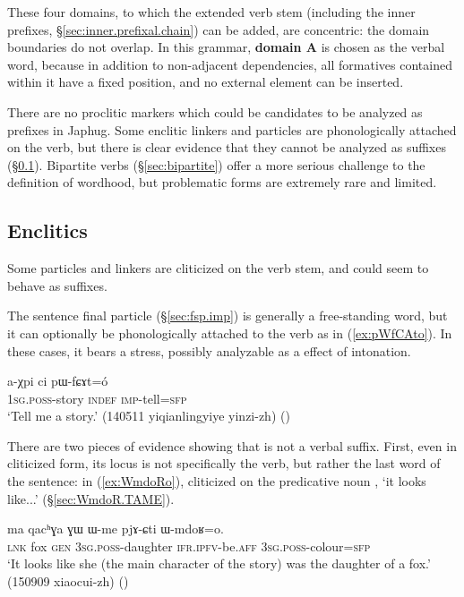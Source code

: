These four domains, to which the extended verb stem (including the inner prefixes, §\ref{sec:inner.prefixal.chain}) can be added, are concentric: the domain boundaries do not overlap. In this grammar, \textbf{domain A} is chosen as the verbal word, because in addition to non-adjacent dependencies, all formatives contained within it have a fixed position, and no external element can be inserted. 

There are no proclitic markers which could be candidates to be analyzed as prefixes in Japhug. Some enclitic linkers and particles are phonologically attached on the verb, but there is clear evidence that they cannot be analyzed as suffixes (§\ref{sec:verb.enclitics}). Bipartite verbs (§\ref{sec:bipartite}) offer a more serious challenge to the definition of wordhood, but problematic forms are extremely rare and limited.

\subsection{Enclitics} \label{sec:verb.enclitics}
Some particles and linkers are cliticized on the verb stem, and could seem to behave as suffixes.

The sentence final particle  (§\ref{sec:fsp.imp}) is generally a free-standing word, but it can optionally be phonologically attached to the verb as in (\ref{ex:pWfCAto}). In these cases, it bears a stress, possibly analyzable as a effect of intonation.


\begin{exe}
\ex \label{ex:pWfCAto}
\gll a-χpi ci pɯ-fɕɤt=ó \\
\textsc{1sg}.\textsc{poss}-story \textsc{indef} \textsc{imp}-tell=\textsc{sfp} \\
\glt `Tell me a story.' (140511 yiqianlingyiye yinzi-zh) 	()
\end{exe}

There are two pieces of evidence showing that  is not a verbal suffix. First, even in cliticized form, its locus is not specifically the verb, but rather the last word of the sentence: in (\ref{ex:WmdoRo}),  cliticized on the predicative noun   , `it looks like...' (§\ref{sec:WmdoR.TAME}).

\begin{exe}
\ex \label{ex:WmdoRo}
\gll ma qacʰɣa ɣɯ ɯ-me pjɤ-ɕti ɯ-mdoʁ=o. \\
\textsc{lnk} fox \textsc{gen} \textsc{3sg}.\textsc{poss}-daughter \textsc{ifr}.\textsc{ipfv}-be.\textsc{aff} \textsc{3sg}.\textsc{poss}-colour=\textsc{sfp} \\
\glt `It looks like she (the main character of the story) was the daughter of a fox.' (150909 xiaocui-zh) ()
\end{exe}


